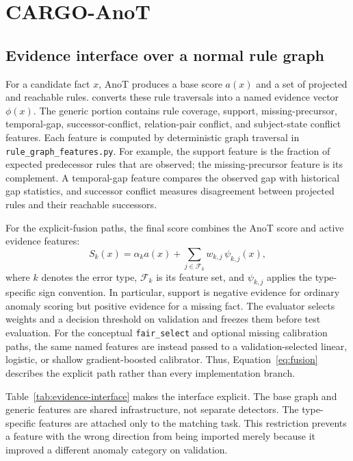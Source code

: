 \section{CARGO-AnoT}

\subsection{Evidence interface over a normal rule graph}

For a candidate fact $x$, AnoT produces a base score $a(x)$ and a set of projected and reachable rules. \method converts these rule traversals into a named evidence vector $\phi(x)$. The generic portion contains rule coverage, support, missing-precursor, temporal-gap, successor-conflict, relation-pair conflict, and subject-state conflict features. Each feature is computed by deterministic graph traversal in \texttt{rule\_graph\_features.py}. For example, the support feature is the fraction of expected predecessor rules that are observed; the missing-precursor feature is its complement. A temporal-gap feature compares the observed gap with historical gap statistics, and successor conflict measures disagreement between projected rules and their reachable successors.

For the explicit-fusion paths, the final score combines the AnoT score and active evidence features:
\begin{equation}
S_k(x)=\alpha_k a(x)+\sum_{j\in\mathcal{F}_k}w_{k,j}\,\psi_{k,j}(x),
\label{eq:fusion}
\end{equation}
where $k$ denotes the error type, $\mathcal{F}_k$ is its feature set, and $\psi_{k,j}$ applies the type-specific sign convention. In particular, support is negative evidence for ordinary anomaly scoring but positive evidence for a missing fact. The evaluator selects weights and a decision threshold on validation and freezes them before test evaluation. For the conceptual \texttt{fair\_select} and optional missing calibration paths, the same named features are instead passed to a validation-selected linear, logistic, or shallow gradient-boosted calibrator. Thus, Equation~\ref{eq:fusion} describes the explicit path rather than every implementation branch.

Table~\ref{tab:evidence-interface} makes the interface explicit. The base graph and generic features are shared infrastructure, not separate detectors. The type-specific features are attached only to the matching task. This restriction prevents a feature with the wrong direction from being imported merely because it improved a different anomaly category on validation.

